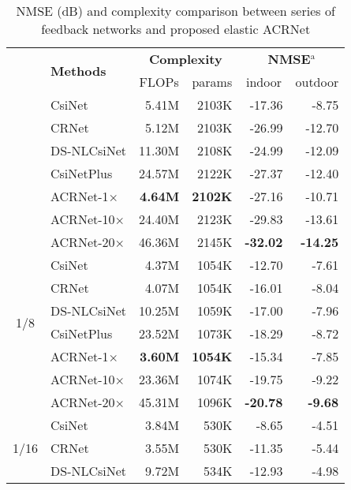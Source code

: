 \documentclass[12pt, draftclsnofoot, onecolumn]{IEEEtran}
\begin{document}
\begin{table}[H]
\caption{NMSE (dB) and complexity comparison between series of feedback networks and proposed elastic ACRNet}
\begin{center}
\makegapedcells \renewcommand\tabcolsep{10pt}
\begin{tabular}{c l | r r | r r}
\Xhline{0.8pt}
\multirow{2}{*}{$\mathbf{\eta}$} & \multirow{2}{*}{\textbf{Methods}} & \multicolumn{2}{c|}{\textbf{Complexity}} & \multicolumn{2}{c}{\textbf{NMSE}$^{\mathrm{a}}$} \\
& & \multicolumn{1}{c}{FLOPs} & \multicolumn{1}{c|}{params} & \multicolumn{1}{c}{indoor} & \multicolumn{1}{c}{outdoor} \\
\Xhline{0.8pt}
\multirow{7}{*}{1/4}
  & CsiNet\cite{wen2018deep} & 5.41M & 2103K & -17.36 & -8.75 \\
  & CRNet\cite{lu2020multi} & 5.12M & 2103K & -26.99 & -12.70 \\
  & DS-NLCsiNet\cite{yu2020ds} & 11.30M & 2108K & -24.99 & -12.09 \\
  & CsiNetPlus\cite{guo2020convolutional} & 24.57M & 2122K & -27.37 & -12.40 \\
  & ACRNet-1$\times$ & \textbf{4.64M} & \textbf{2102K} & -27.16 & -10.71 \\
  & ACRNet-10$\times$ & 24.40M & 2123K & -29.83 & -13.61 \\
  & ACRNet-20$\times$ & 46.36M & 2145K & \textbf{-32.02} & \textbf{-14.25} \\
\hline
\multirow{6}{*}{1/8}
  & CsiNet\cite{wen2018deep} & 4.37M & 1054K & -12.70 & -7.61 \\
  & CRNet\cite{lu2020multi} & 4.07M & 1054K & -16.01 & -8.04 \\
  & DS-NLCsiNet\cite{yu2020ds} & 10.25M & 1059K & -17.00 & -7.96 \\
  & CsiNetPlus\cite{guo2020convolutional} & 23.52M & 1073K & -18.29 & -8.72 \\
  & ACRNet-1$\times$ & \textbf{3.60M} & \textbf{1054K} & -15.34 & -7.85 \\
  & ACRNet-10$\times$ & 23.36M & 1074K & -19.75 & -9.22 \\
  & ACRNet-20$\times$ & 45.31M & 1096K & \textbf{-20.78} & \textbf{-9.68} \\
\hline
\multirow{6}{*}{1/16}
  & CsiNet\cite{wen2018deep} & 3.84M & 530K & -8.65 & -4.51 \\
  & CRNet\cite{lu2020multi} & 3.55M & 530K & -11.35 & -5.44 \\
  & DS-NLCsiNet\cite{yu2020ds} & 9.72M & 534K & -12.93 & -4.98 \\

\end{tabular}
\end{center}
\end{table}
\end{document}

